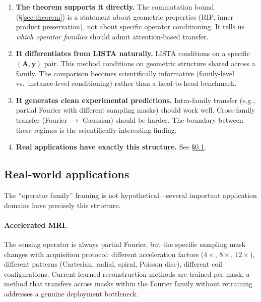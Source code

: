 \documentclass[11pt]{article}
\newcommand{\A}{\mathbf{A}}
\newcommand{\y}{\mathbf{y}}
\begin{document}
\begin{enumerate}[leftmargin=2em]
    \item \textbf{The theorem supports it directly.}
    The commutation bound (\S\ref{sec:theorem}) is a statement
    about geometric properties (RIP, inner product preservation),
    not about specific operator conditioning.
    It tells us \emph{which operator families} should admit
    attention-based transfer.

    \item \textbf{It differentiates from LISTA naturally.}
    LISTA conditions on a specific $(\A, \y)$ pair.
    This method conditions on geometric structure shared
    across a family.
    The comparison becomes scientifically informative
    (family-level vs.\ instance-level conditioning) rather than
    a head-to-head benchmark.

    \item \textbf{It generates clean experimental predictions.}
    Intra-family transfer (e.g., partial Fourier with different
    sampling masks) should work well.
    Cross-family transfer (Fourier $\to$ Gaussian) should be
    harder. The boundary between these regimes is the
    scientifically interesting finding.

    \item \textbf{Real applications have exactly this structure.}
    See \S\ref{sec:applications}.
\end{enumerate}

\subsection{Real-world applications}
\label{sec:applications}

The ``operator family'' framing is not hypothetical---several
important application domains have precisely this structure.

\paragraph{Accelerated MRI.}
The sensing operator is always partial Fourier, but the
specific sampling mask changes with acquisition protocol:
different acceleration factors ($4\times$, $8\times$, $12\times$),
different patterns (Cartesian, radial, spiral, Poisson disc),
different coil configurations.
Current learned reconstruction methods are trained per-mask;
a method that transfers across masks within the Fourier family
without retraining addresses a genuine deployment bottleneck.
\end{document}
